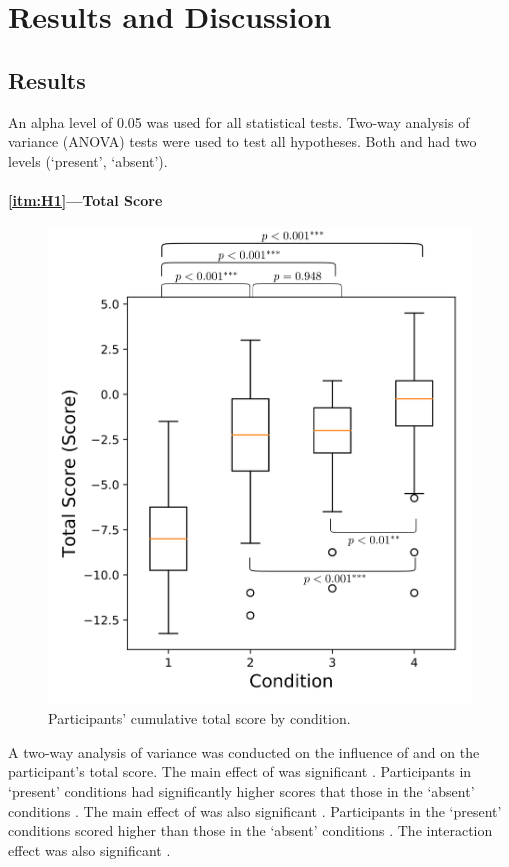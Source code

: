 \section{Results and Discussion} \label{sec:results_discussion}
\subsection{Results} \label{sec:results}
An alpha level of 0.05 was used for all statistical tests. Two-way analysis of variance (ANOVA) tests were used to test all hypotheses. Both \xQ{} and \xO had two levels (`present', `absent').

\paragraph{\ref{itm:H1}---Total Score}
       \begin{figure}[tb]
            \centering
            \includegraphics[width=0.7\linewidth]{Figures/total_score_box.png}
            \caption{Participants' cumulative total score by condition.}
            \label{fig:score_box}
       \end{figure}
A two-way analysis of variance was conducted on the influence of \xQ{} and \xO{} on the participant's total score. The main effect of \xQ{} was significant . Participants in \xQ{} `present' conditions had significantly higher scores  that those in the \xQ{} `absent' conditions . The main effect of \xO{} was also significant . Participants in the \xO{} `present' conditions scored higher  than those in the \xO{} `absent' conditions . The interaction effect was also significant .

